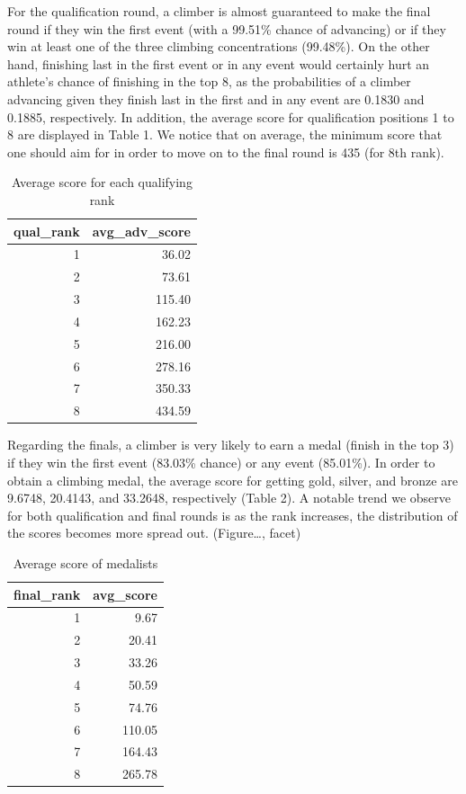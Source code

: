 \documentclass[12pt]{article}
\begin{document}
For the qualification round, a climber is almost guaranteed to make the
final round if they win the first event (with a 99.51\% chance of
advancing) or if they win at least one of the three climbing
concentrations (99.48\%). On the other hand, finishing last in the first
event or in any event would certainly hurt an athlete's chance of
finishing in the top 8, as the probabilities of a climber advancing
given they finish last in the first and in any event are 0.1830 and
0.1885, respectively. In addition, the average score for qualification
positions 1 to 8 are displayed in Table 1. We notice that on average,
the minimum score that one should aim for in order to move on to the
final round is 435 (for 8th rank).

\begin{table}[ht]
\centering
\caption{Average score for each qualifying rank} 
\begin{tabular}{rr}
  \hline
qual\_rank & avg\_adv\_score \\ 
  \hline
  1 & 36.02 \\ 
    2 & 73.61 \\ 
    3 & 115.40 \\ 
    4 & 162.23 \\ 
    5 & 216.00 \\ 
    6 & 278.16 \\ 
    7 & 350.33 \\ 
    8 & 434.59 \\ 
   \hline
\end{tabular}
\end{table}

Regarding the finals, a climber is very likely to earn a medal (finish
in the top 3) if they win the first event (83.03\% chance) or any event
(85.01\%). In order to obtain a climbing medal, the average score for
getting gold, silver, and bronze are 9.6748, 20.4143, and 33.2648,
respectively (Table 2). A notable trend we observe for both
qualification and final rounds is as the rank increases, the
distribution of the scores becomes more spread out. (Figure\ldots,
facet)

\begin{table}[ht]
\centering
\caption{Average score of medalists} 
\begin{tabular}{rr}
  \hline
final\_rank & avg\_score \\ 
  \hline
  1 & 9.67 \\ 
    2 & 20.41 \\ 
    3 & 33.26 \\ 
    4 & 50.59 \\ 
    5 & 74.76 \\ 
    6 & 110.05 \\ 
    7 & 164.43 \\ 
    8 & 265.78 \\ 
   \hline
\end{tabular}
\end{table}
\end{document}
